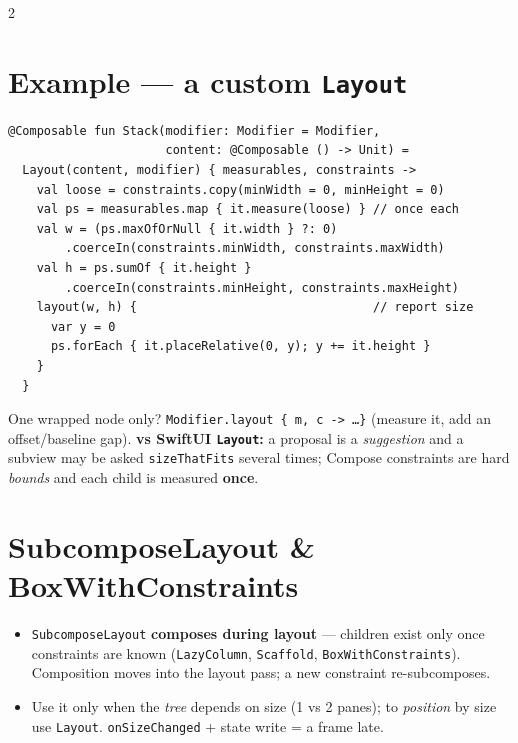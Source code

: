 \documentclass[8pt]{extarticle}
\newcommand\arr{\hbox{-}\hbox{>}}
\begin{document}
\begin{multicols}{2}
\section{Example — a custom \texttt{Layout}}
\begin{lstlisting}[language=KotlinSheet]
@Composable fun Stack(modifier: Modifier = Modifier,
                      content: @Composable () -> Unit) =
  Layout(content, modifier) { measurables, constraints ->
    val loose = constraints.copy(minWidth = 0, minHeight = 0)
    val ps = measurables.map { it.measure(loose) } // once each
    val w = (ps.maxOfOrNull { it.width } ?: 0)
        .coerceIn(constraints.minWidth, constraints.maxWidth)
    val h = ps.sumOf { it.height }
        .coerceIn(constraints.minHeight, constraints.maxHeight)
    layout(w, h) {                                 // report size
      var y = 0
      ps.forEach { it.placeRelative(0, y); y += it.height }
    }
  }
\end{lstlisting}
\raggedright One wrapped node only? \texttt{Modifier.layout \{ m, c \arr{} …\}} (measure it, add
an offset/baseline gap). \textbf{vs SwiftUI \texttt{Layout}:} a proposal is a \emph{suggestion}
and a subview may be asked \texttt{sizeThatFits} several times; Compose constraints are hard
\emph{bounds} and each child is measured \textbf{once}.

\columnbreak

\section{SubcomposeLayout \& BoxWithConstraints}
\begin{itemize}\raggedright
  \item \texttt{SubcomposeLayout} \textbf{composes during layout} — children exist only once
        constraints are known (\texttt{LazyColumn}, \texttt{Scaffold},
        \texttt{BoxWithConstraints}). Composition moves into the layout pass; a new constraint
        re-subcomposes.
  \item Use it only when the \emph{tree} depends on size (1 vs 2 panes); to \emph{position} by
        size use \texttt{Layout}. \texttt{onSizeChanged} + state write = a frame late.
\end{itemize}


\end{multicols}
\end{document}
